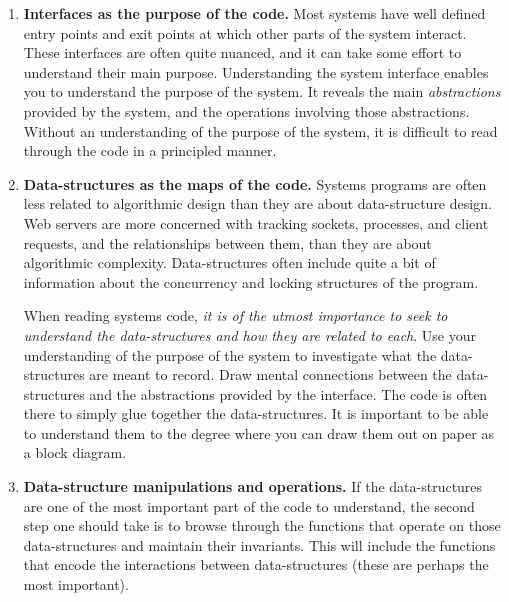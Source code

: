 \documentclass[11pt,onecolumn]{article}
\newcommand{\lsthead}[1]{{\bf #1}}
\begin{document}
\begin{enumerate}[itemsep=0pt,topsep=1pt,parsep=1pt,leftmargin=2.5em]
\item \lsthead{Interfaces as the purpose of the code.}  Most systems
  have well defined entry points and exit points at which other parts
  of the system interact.  These interfaces are often quite nuanced,
  and it can take some effort to understand their main purpose.
  Understanding the system interface enables you to understand the
  purpose of the system.  It reveals the main {\em abstractions}
  provided by the system, and the operations involving those
  abstractions.  Without an understanding of the purpose of the
  system, it is difficult to read through the code in a principled
  manner.
\item \lsthead{Data-structures as the maps of the code.}  Systems
  programs are often less related to algorithmic design than they are
  about data-structure design.  Web servers are more concerned with
  tracking sockets, processes, and client requests, and the
  relationships between them, than they are about algorithmic
  complexity.  Data-structures often include quite a bit of
  information about the concurrency and locking structures of the
  program.

  When reading systems code, {\em it is of the utmost importance to
    seek to understand the data-structures and how they are related to
    each}.  Use your understanding of the purpose of the system to
  investigate what the data-structures are meant to record.  Draw
  mental connections between the data-structures and the abstractions
  provided by the interface.  The code is often there to simply glue
  together the data-structures.  It is important to be able to
  understand them to the degree where you can draw them out on paper
  as a block diagram.
\item \lsthead{Data-structure manipulations and operations.}  If the
  data-structures are one of the most important part of the code to
  understand, the second step one should take is to browse through the
  functions that operate on those data-structures and maintain their
  invariants.  This will include the functions that encode the
  interactions between data-structures (these are perhaps the most
  important).


\end{enumerate}
\end{document}
